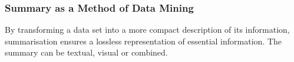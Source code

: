 \subsubsection{Summary as a Method of Data Mining}

By transforming a data set into a more compact description of its information, summarisation ensures a lossless representation of essential information. The summary can be textual, visual or combined.



%
%
